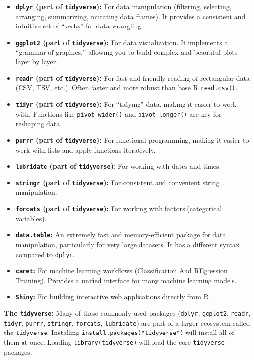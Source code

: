 \documentclass[
]{article}
\providecommand{\tightlist}{%
  \setlength{\itemsep}{0pt}\setlength{\parskip}{0pt}}
\begin{document}
\begin{itemize}
\tightlist
\item
  \textbf{\texttt{dplyr} (part of \texttt{tidyverse}):} For data
  manipulation (filtering, selecting, arranging, summarizing, mutating
  data frames). It provides a consistent and intuitive set of ``verbs''
  for data wrangling.
\item
  \textbf{\texttt{ggplot2} (part of \texttt{tidyverse}):} For data
  visualization. It implements a ``grammar of graphics,'' allowing you
  to build complex and beautiful plots layer by layer.
\item
  \textbf{\texttt{readr} (part of \texttt{tidyverse}):} For fast and
  friendly reading of rectangular data (CSV, TSV, etc.). Often faster
  and more robust than base R \texttt{read.csv()}.
\item
  \textbf{\texttt{tidyr} (part of \texttt{tidyverse}):} For ``tidying''
  data, making it easier to work with. Functions like
  \texttt{pivot\_wider()} and \texttt{pivot\_longer()} are key for
  reshaping data.
\item
  \textbf{\texttt{purrr} (part of \texttt{tidyverse}):} For functional
  programming, making it easier to work with lists and apply functions
  iteratively.
\item
  \textbf{\texttt{lubridate} (part of \texttt{tidyverse}):} For working
  with dates and times.
\item
  \textbf{\texttt{stringr} (part of \texttt{tidyverse}):} For consistent
  and convenient string manipulation.
\item
  \textbf{\texttt{forcats} (part of \texttt{tidyverse}):} For working
  with factors (categorical variables).
\item
  \textbf{\texttt{data.table}:} An extremely fast and memory-efficient
  package for data manipulation, particularly for very large datasets.
  It has a different syntax compared to \texttt{dplyr}.
\item
  \textbf{\texttt{caret}:} For machine learning workflows
  (Classification And REgression Training). Provides a unified interface
  for many machine learning models.
\item
  \textbf{\texttt{Shiny}:} For building interactive web applications
  directly from R.
\end{itemize}

\textbf{The \texttt{tidyverse}:} Many of these commonly used packages
(\texttt{dplyr}, \texttt{ggplot2}, \texttt{readr}, \texttt{tidyr},
\texttt{purrr}, \texttt{stringr}, \texttt{forcats}, \texttt{lubridate})
are part of a larger ecosystem called the \texttt{tidyverse}. Installing
\texttt{install.packages("tidyverse")} will install all of them at once.
Loading \texttt{library(tidyverse)} will load the core
\texttt{tidyverse} packages.
\end{document}
